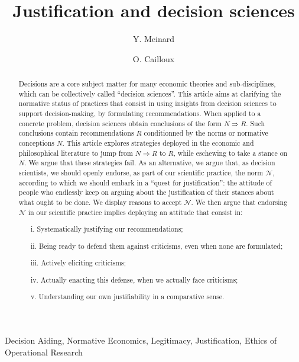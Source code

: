 \documentclass[preprint, french, english, 11pt, authoryear]{elsarticle}%
\newcommand{\adv}{\mathscr{N}}
\begin{document}
\title{Justification and decision sciences}

\author[ld]{Y. Meinard}
\author[ld]{O. Cailloux}
\address[ld]{Universit\'e Paris-Dauphine, PSL Research University, CNRS, UMR [7243], LAMSADE, 75016 PARIS, FRANCE}

\begin{abstract}
Decisions are a core subject matter for many economic theories and sub-disciplines, which can be collectively called ``decision sciences''. This article aims at clarifying the normative status of practices that consist in using insights from decision sciences to support decision-making, by formulating recommendations. When applied to a concrete problem, decision sciences obtain conclusions of the form $N ⇒ R$. Such conclusions contain recommendations $R$ conditionned by the norms or normative conceptions $N$. This article explores strategies deployed in the economic and philosophical literature to jump from $N ⇒ R$ to $R$, while eschewing to take a stance on $N$. We argue that these strategies fail. As an alternative, we argue that, as decision scientists, we should openly endorse, as part of our scientific practice, the norm $\adv$, according to which we should embark in a ``quest for justification'': the attitude of people who endlessly keep on arguing about the justification of their stances about what ought to be done. We display reasons to accept $\adv$. We then argue that endorsing $\adv$ in our scientific practice implies deploying an attitude that consist in:
\begin{itemize}
\item[i.]	Systematically justifying our recommendations;
\item[ii.]	Being ready to defend them against criticisms, even when none are formulated;
\item[iii.]	Actively eliciting criticisms;
\item[iv.]	Actually enacting this defense, when we actually face criticisms;
\item[v.]	Understanding our own justifiability in a comparative sense.
\end{itemize}
\end{abstract}

\begin{keyword}
Decision Aiding, Normative Economics, Legitimacy, Justification, Ethics of Operational Research
\end{keyword}

\maketitle
\end{document}
